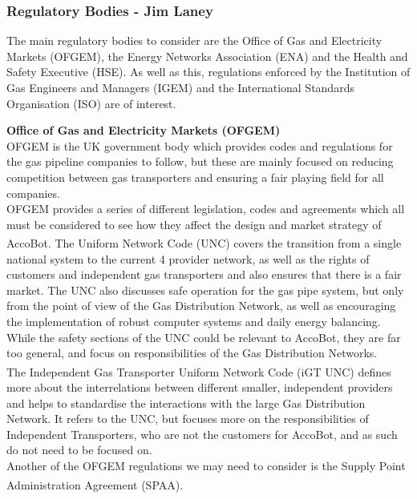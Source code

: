 \documentclass[11pt]{article}		%
\newcommand{\supercite}[1]{\textsuperscript{\cite{#1}}}		%
\begin{document}
		\subsubsection[Regulatory Bodies]{Regulatory Bodies - Jim Laney} 
		\label{govermentreg}
			
			The main regulatory bodies to consider are the Office of Gas and Electricity Markets (OFGEM), the Energy Networks Association (ENA) and the Health and Safety Executive (HSE).
			As well as this, regulations enforced by the Institution of Gas Engineers and Managers (IGEM) and the International Standards Organisation (ISO) are of interest.
 			
 			\textbf{Office of Gas and Electricity Markets (OFGEM)}
 			\\
			OFGEM is the UK government body which provides codes and regulations for the gas pipeline companies to follow, but these are mainly focused on reducing competition between gas transporters and ensuring a fair playing field for all companies.
		    \\
		    \hspace*{3ex}OFGEM provides a series of different legislation, codes and agreements which all must be considered to see how they affect the design and market strategy of AccoBot.
			The Uniform Network Code (UNC)\supercite{joint2005uniform} covers the transition from a single national system to the current 4 provider network, as well as the rights of customers and independent gas transporters and also ensures that there is a fair market.
			The UNC also discusses safe operation for the gas pipe system, but only from the point of view of the Gas Distribution Network, as well as encouraging the implementation of robust computer systems and daily energy balancing.
			While the safety sections of the UNC could be relevant to AccoBot, they are far too general, and focus on responsibilities of the Gas Distribution Networks.
		    \\
            \hspace*{3ex}The Independent Gas Transporter Uniform Network Code (iGT UNC)\supercite{igt2021independent} defines more about the interrelations between different smaller, independent providers and helps to standardise the interactions with the large Gas Distribution Network.
			It refers to the UNC, but focuses more on the responsibilities of Independent Transporters, who are not the customers for AccoBot, and as such do not need to be focused on.
			\\
            \hspace*{3ex}Another of the OFGEM regulations we may need to consider is the Supply Point Administration Agreement (SPAA)\supercite{spaa2021supply}. 
\end{document}

